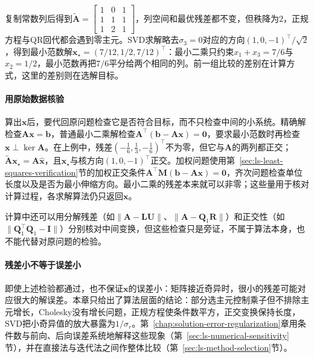 复制常数列后得到$\widetilde{\bm A}=\left[\begin{smallmatrix}1&0&1\\1&1&1\\1&2&1\end{smallmatrix}\right]$，列空间和最优残差都不变，但秩降为$2$，正规方程与QR回代都会遇到零主元。SVD求解略去$\sigma_3=0$对应的方向$(1,0,-1)^\top/\sqrt2$，得到最小范数解$\bm x_\star=(7/12,1/2,7/12)^\top$：最小二乘只约束$x_1+x_3=7/6$与$x_2=1/2$，最小范数再把$7/6$平分给两个相同的列。前一组比较的差别在计算方式，这里的差别则在选解目标。

\paragraph{用原始数据核验}
算出$\bm x$后，要代回原问题检查它是否符合目标，而不只检查中间的小系统。精确解检查$\bm A\bm x=\bm b$，普通最小二乘解检查$\bm A^\top(\bm b-\bm A\bm x)=\bm0$，要求最小范数时再检查$\bm x\perp\ker\bm A$。在上例中，残差$(-\tfrac16,\tfrac13,-\tfrac16)^\top$不为零，但它与$\bm A$的两列都正交；$\widetilde{\bm A}\bm x_\star=\bm A\hat{\bm x}$，且$\bm x_\star$与核方向$(1,0,-1)^\top$正交。加权问题使用第~\ref{sec:ls-least-squares-verification}节的加权正交条件$\bm A^\top\bm M(\bm b-\bm A\bm x)=\bm0$，齐次问题检查单位长度以及是否为最小伸缩方向。最小二乘的残差本来就可以非零；这些量用于核对计算过程，各求解算法仍只返回$\bm x$。

计算中还可以用分解残差（如$\lVert\bm A-\bm L\bm U\rVert$、$\lVert\bm A-\bm Q_1\bm R\rVert$）和正交性（如$\lVert\bm Q_1^\top\bm Q_1-\bm I\rVert$）分别核对中间变换，但这些检查只是旁证，不属于算法本身，也不能代替对原问题的检验。

\paragraph{残差小不等于误差小}
即使上述检验都通过，也不保证$\bm x$的误差小：矩阵接近奇异时，很小的残差可能对应很大的解误差。本章只给出了算法层面的结论：部分选主元控制乘子但不排除主元增长，Cholesky没有增长问题，正规方程使条件数平方，正交变换保持长度，SVD把小奇异值的放大暴露为$1/\sigma_r$。第~\ref{chap:solution-error-regularization}章用条件数与前向、后向误差系统地解释这些现象（第~\ref{sec:ls-numerical-sensitivity}节），并在直接法与迭代法之间作整体比较（第~\ref{sec:ls-method-selection}节）。

